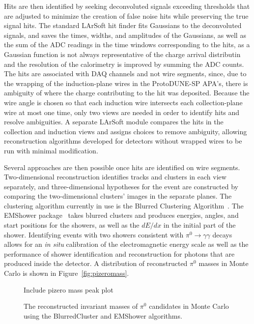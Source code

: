 Hits are then identified by seeking deconvoluted signals exceeding
thresholds that are adjusted to minimize the creation of false noise
hits while preserving the true signal hits.  The standard LArSoft hit
finder fits Gaussians to the deconvoluted signals, and saves the
times, widths, and amplitudes of the Gaussians, as well as the sum of
the ADC readings in the time windows corresponding to the hits, as a
Gaussian function is not always representative of the charge arrival
distributin and the resolution of the calorimetry is improved by
summing the ADC counts.  The hits are associated with DAQ channels and
not wire segments, since, due to the wrapping of the induction-plane
wires in the ProtoDUNE-SP APA's, there is ambiguity of where the
charge contributing to the hit was deposited.  Because the wire angle
is chosen so that each induction wire intersects each collection-plane
wire at most one time, only two views are needed in order to identify
hits and resolve ambiguities.  A separate LArSoft module compares the
hits in the collection and induction views and assigns choices to
remove ambiguity, allowing reconstruction algorithms developed for
detectors without wrapped wires to be run with minimal modification.

Several approaches are then possible once hits are identified on wire
segments.  Two-dimensional reconstruction identifies tracks and
clusters in each view separately, and three-dimensional hypotheses for
the event are constructed by comparing the two-dimensional clusters'
images in the separate planes.  The clustering algorithm currently in
use is the Blurred Clustering Algorithm~\cite{blurredclustering}.  The
EMShower package~\cite{emshowerpackage} takes blurred clusters and
produces energies, angles, and start positions for the showers, as
well as the $dE/dx$ in the initial part of the shower.  Identifying
events with two showers consistent with $\pi^0\rightarrow\gamma\gamma$
decays allows for an {\it in situ} calibration of the electromagnetic
energy scale as well as the performance of shower identification and
reconstruction for photons that are produced inside the detector.  A
distribution of reconstructed $\pi^0$ masses in Monte Carlo is shown
in Figure~\ref{fig:pizeromass}.

\begin{figure}[htb]
\centering
Include pizero mass peak plot
\caption{The reconstructed invariant masses of $\pi^0$ candidates in
  Monte Carlo using the BlurredCluster and EMShower algorithms.  }
\label{fig:muonpandoraperf}
\end{figure}

